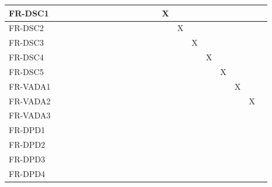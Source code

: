 \documentclass[12pt, titlepage]{article}
\begin{document}
\begin{table}[!ht]
{\begin{tabular}{|l|l|l|l|l|l|l|l|l|l|l|l|l|l|l|l|l|}
      FR-DSC1 & ~ & ~ & ~ & ~ & ~ & ~ & ~ & ~ & X & ~ & ~ & ~ & ~ & ~ & ~ \\ \hline
      FR-DSC2 & ~ & ~ & ~ & ~ & ~ & ~ & ~ & ~ & ~ & X & ~ & ~ & ~ & ~ & ~ \\ \hline
      FR-DSC3 & ~ & ~ & ~ & ~ & ~ & ~ & ~ & ~ & ~ & ~ & X & ~ & ~ & ~ & ~ \\ \hline
      FR-DSC4 & ~ & ~ & ~ & ~ & ~ & ~ & ~ & ~ & ~ & ~ & ~ & X & ~ & ~ & ~ \\ \hline
      FR-DSC5 & ~ & ~ & ~ & ~ & ~ & ~ & ~ & ~ & ~ & ~ & ~ & ~ & X & ~ & ~ \\ \hline
      FR-VADA1 & ~ & ~ & ~ & ~ & ~ & ~ & ~ & ~ & ~ & ~ & ~ & ~ & ~ & X & ~ \\ \hline
      FR-VADA2 & ~ & ~ & ~ & ~ & ~ & ~ & ~ & ~ & ~ & ~ & ~ & ~ & ~ & ~ & X \\ \hline
      FR-VADA3 & ~ & ~ & ~ & ~ & ~ & ~ & ~ & ~ & ~ & ~ & ~ & ~ & ~ & ~ & ~ \\ \hline
      FR-DPD1 & ~ & ~ & ~ & ~ & ~ & ~ & ~ & ~ & ~ & ~ & ~ & ~ & ~ & ~ & ~ \\ \hline
      FR-DPD2 & ~ & ~ & ~ & ~ & ~ & ~ & ~ & ~ & ~ & ~ & ~ & ~ & ~ & ~ & ~ \\ \hline
      FR-DPD3 & ~ & ~ & ~ & ~ & ~ & ~ & ~ & ~ & ~ & ~ & ~ & ~ & ~ & ~ & ~ \\ \hline
      FR-DPD4 & ~ & ~ & ~ & ~ & ~ & ~ & ~ & ~ & ~ & ~ & ~ & ~ & ~ & ~ & ~ \\ \hline
  \end{tabular}
  }
\end{table}
\end{document}
